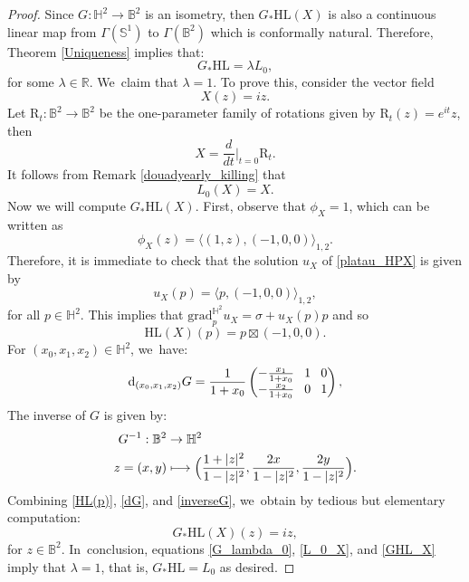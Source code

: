 \documentclass[11pt]{article}
\newcommand\mto{\mathchoice{\longmapsto}{\mapsto}{\mapsto}{\mapsto}}
\theoremstyle{plain}
\theoremstyle{definition}
\newcommand{\grad}{\mathrm{grad}^{\mathbb{H}^2}}
\begin{document}
\begin{proof}
Since \(G:\mathbb{H}^2 \to \mathbb{B}^2\) is an isometry, then \(G_*\mathrm{HL}(X)\) is also a continuous linear map from \(\Gamma(\mathbb{S}^1)\) to \(\Gamma(\mathbb{B}^2)\) which is conformally natural. Therefore, Theorem \ref{Uniqueness} implies that:
\begin{equation}\label{G_lambda_0}
G_*\mathrm{HL} = \lambda L_0,
\end{equation}
for some \(\lambda \in \mathbb{R}\). We~claim that \(\lambda = 1\). To prove this, consider the vector field
\[ X(z) = iz. \]
Let \(\mathrm{R}_t:\mathbb{B}^2 \to \mathbb{B}^2\) be the one-parameter family of rotations given by \(\mathrm{R}_t(z) = e^{it}z\), then
\[ X = \frac{d}{dt}\Big\lvert_{t=0}\mathrm{R}_t. \]
It follows from Remark \ref{douadyearly_killing} that
\begin{equation}\label{L_0_X}
L_0(X) = X.
\end{equation}
Now we will compute \(G_*\mathrm{HL}(X)\). First, observe that \(\phi_X = 1\), which can be written as
\[ \phi_X(z) = \langle (1,z), (-1,0,0) \rangle_{1,2}. \]
Therefore, it is immediate to check that the solution \(u_X\) of \eqref{platau_HPX} is given by
\[ u_X(p) = \langle p, (-1,0,0) \rangle_{1,2}, \]
for all \(p \in \mathbb{H}^2\). This implies that \(\grad_p u_X = \sigma + u_X(p) p\) and so
\begin{equation}\label{HL(p)}
\mathrm{HL}(X)(p) = p \boxtimes (-1,0,0).
\end{equation}
For \((x_0,x_1,x_2) \in \mathbb{H}^2\), we~have:
\begin{equation}\label{dG}
\arraycolsep4pt
\mathrm{d}_{(x_0,x_1,x_2)}G = \frac{1}{1 + x_0} \begin{pmatrix}
-\frac{x_1}{1 + x_0} & 1 & 0 \\
-\frac{x_2}{1 + x_0} & 0 & 1
\end{pmatrix},
\end{equation}
The inverse of \(G\) is given by:
\begin{equation}\label{inverseG}
\begin{aligned}
G^{-1}:\mathbb{B}^2 & \to \mathbb{H}^2 \\
z = (x,y) & \mto\Bigl(\frac{1 + \lvert z \rvert^2}{1 - \lvert z \rvert^2}, \frac{2x}{1 - \lvert z \rvert^2}, \frac{2y}{1 - \lvert z \rvert^2} \Bigr).
\end{aligned}
\end{equation}
Combining \eqref{HL(p)}, \eqref{dG}, and \eqref{inverseG}, we~obtain by tedious but elementary computation:
\begin{equation}\label{GHL_X}
G_*\mathrm{HL}(X)(z) = iz,
\end{equation}
for \(z \in \mathbb{B}^2\). In~conclusion, equations \eqref{G_lambda_0}, \eqref{L_0_X}, and \eqref{GHL_X} imply that \(\lambda = 1\), that is, \(G_*\mathrm{HL} = L_0\) as desired.
\end{proof}
\end{document}
